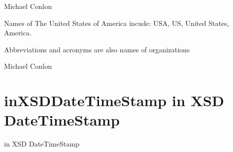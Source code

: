 \documentclass[letterpaper,10pt,english]{sphinxmanual}
\begin{document}
\begin{sphinxShadowBox}

\sphinxAtStartPar
Michael Conlon 
\end{sphinxShadowBox}

\begin{sphinxShadowBox}

\sphinxAtStartPar
{\hyperref[\detokenize{doc-ORG_0000001::doc}]{}}
\end{sphinxShadowBox}

\begin{sphinxShadowBox}

\sphinxAtStartPar
{}
\end{sphinxShadowBox}

\begin{sphinxShadowBox}

\sphinxAtStartPar
Names of The United States of America incude: USA, US, United States, America.
\end{sphinxShadowBox}

\begin{sphinxShadowBox}

\sphinxAtStartPar
Abbreviations and acronyms are also names of organizations
\end{sphinxShadowBox}

\begin{sphinxShadowBox}

\sphinxAtStartPar
Michael Conlon 
\end{sphinxShadowBox}
\begin{quote}

\ignorespaces \end{quote}


\section{inXSDDateTimeStamp \sphinxhyphen{} in XSD Date\sphinxhyphen{}Time\sphinxhyphen{}Stamp}
\label{\detokenize{doc-inXSDDateTimeStamp:inxsddatetimestamp-in-xsd-date-time-stamp}}\label{\detokenize{doc-inXSDDateTimeStamp:index-0}}\label{\detokenize{doc-inXSDDateTimeStamp::doc}}
\begin{sphinxShadowBox}

\sphinxAtStartPar
in XSD Date\sphinxhyphen{}Time\sphinxhyphen{}Stamp
\end{sphinxShadowBox}
\end{document}
